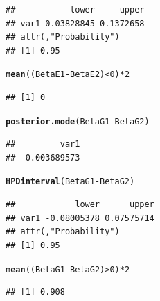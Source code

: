 \documentclass{article}\usepackage[]{graphicx}\usepackage[]{color}
\makeatletter
\newcommand{\hlnum}[1]{\textcolor[rgb]{0.686,0.059,0.569}{#1}}%
\newcommand{\hlopt}[1]{\textcolor[rgb]{0,0,0}{#1}}%
\newcommand{\hlstd}[1]{\textcolor[rgb]{0.345,0.345,0.345}{#1}}%
\newcommand{\hlkwd}[1]{\textcolor[rgb]{0.737,0.353,0.396}{\textbf{#1}}}%
\newenvironment{kframe}{%
 \def\at@end@of@kframe{}%
 \ifinner\ifhmode%
  \def\at@end@of@kframe{\end{minipage}}%
  \begin{minipage}{\columnwidth}%
 \fi\fi%
 \def\FrameCommand##1{\hskip\@totalleftmargin \hskip-\fboxsep
 \colorbox{shadecolor}{##1}\hskip-\fboxsep
     \hskip-\linewidth \hskip-\@totalleftmargin \hskip\columnwidth}%
 \MakeFramed {\advance\hsize-\width
   \@totalleftmargin\z@ \linewidth\hsize
   \@setminipage}}%
 {\par\unskip\endMakeFramed%
 \at@end@of@kframe}
\newenvironment{knitrout}{}{} %
\makeatother
\begin{document}
\begin{knitrout}
\begin{kframe}
\begin{alltt}
\end{alltt}
\begin{verbatim}
##           lower     upper
## var1 0.03828845 0.1372658
## attr(,"Probability")
## [1] 0.95
\end{verbatim}
\begin{alltt}
\hlkwd{mean}\hlstd{((BetaE1} \hlopt{-} \hlstd{BetaE2)}\hlopt{<}\hlnum{0}\hlstd{)}\hlopt{*}\hlnum{2}
\end{alltt}
\begin{verbatim}
## [1] 0
\end{verbatim}
\begin{alltt}
\hlkwd{posterior.mode}\hlstd{(BetaG1} \hlopt{-} \hlstd{BetaG2)}
\end{alltt}
\begin{verbatim}
##         var1 
## -0.003689573
\end{verbatim}
\begin{alltt}
\hlkwd{HPDinterval}\hlstd{(BetaG1} \hlopt{-} \hlstd{BetaG2)}
\end{alltt}
\begin{verbatim}
##            lower      upper
## var1 -0.08005378 0.07575714
## attr(,"Probability")
## [1] 0.95
\end{verbatim}
\begin{alltt}
\hlkwd{mean}\hlstd{((BetaG1} \hlopt{-} \hlstd{BetaG2)}\hlopt{>}\hlnum{0}\hlstd{)}\hlopt{*}\hlnum{2}
\end{alltt}
\begin{verbatim}
## [1] 0.908
\end{verbatim}
\end{kframe}
\end{knitrout}
\end{document}
